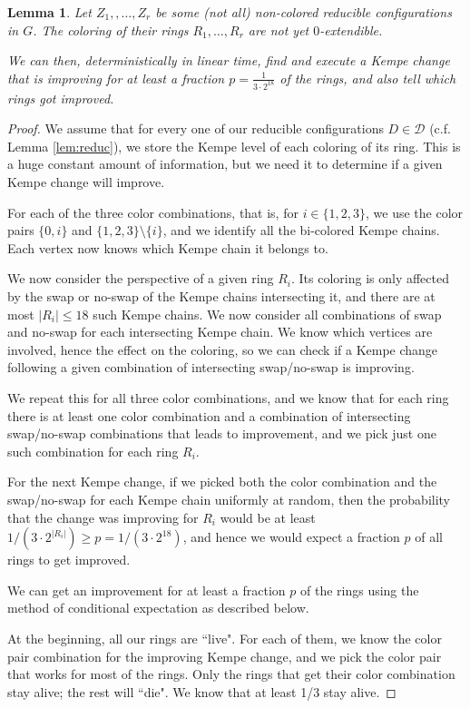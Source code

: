 \documentclass[10pt,a4paper]{article}
\newtheorem{lem}[thm]{Lemma}
\def\cD{{\mathcal D}}
\begin{document}
\begin{lem}\label{lem:det-Kempe-change}
    Let $Z_1,,\ldots, Z_r$ be some (not all) non-colored reducible configurations in $G$. The coloring of their rings  $R_1,\ldots,R_r$ are not yet $0$-extendible.
    
    We can then, deterministically in linear time, find and execute a Kempe change that is improving for at least a fraction $p=\frac1{3\cdot 2^{18}}$ of the rings, and also tell which rings got  improved.
\end{lem}
\begin{proof}
We assume that for every one of our reducible configurations $D \in \cD$ (c.f. Lemma \ref{lem:reduc}), we store the Kempe level of each coloring of its ring. This is a huge constant amount of information, but we need it to determine if a given Kempe change will improve.

For each of the three color combinations, that is, for $i\in\{1,2,3\}$, we use the color pairs $\{0,i\}$ and $\{1,2,3\}\setminus \{i\}$, and we identify all the bi-colored Kempe chains. Each vertex now knows which Kempe chain it belongs to.

We now consider the perspective of a given ring $R_i$. Its coloring is only affected by the swap or no-swap of the Kempe chains intersecting it, and there are at most $|R_i|\le18$ such Kempe chains. We now consider all combinations of swap and no-swap for each
intersecting Kempe chain. We know which vertices are involved, hence the effect on the coloring, so we can 
check if a Kempe change following a given combination of intersecting swap/no-swap is improving.

We repeat this for all three color combinations, and we know that for each ring there is at least one color combination and a combination of intersecting swap/no-swap combinations that leads to improvement, and we pick just one such combination for each ring $R_i$.

For the next Kempe change, if we picked both the color combination and the swap/no-swap for each Kempe chain uniformly at random, then the probability that the change was improving for $R_i$ would be at
least $1/(3\cdot 2^{|R_i|})\geq p=1/(3\cdot 2^{18})$, and hence we would expect a fraction $p$ of all rings to get improved. 

We can get an improvement for at least a fraction $p$ of the rings using the method of conditional expectation as described below.

At the beginning, all our rings are ``live". For each of them, we know the color pair combination for the improving Kempe change, and we pick the color pair that works for most of the rings. Only the rings that get their color combination stay alive; the rest will ``die". We know that at least 1/3 stay alive.


\end{proof}
\end{document}
